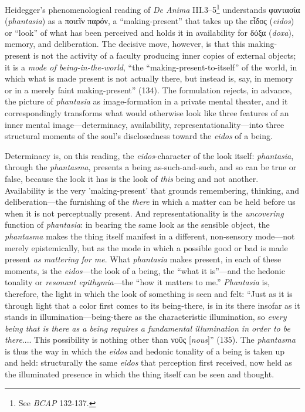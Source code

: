 \documentclass{article}
\newcommand{\gk}[1]{{\greekfont #1}}
\begin{document}
Heidegger's phenomenological reading of \textit{De Anima} III.3–5\footnote{See \textit{BCAP} 132-137.} understands \gk{φαντασία} (\textit{phantasia}) as a \gk{ποιεῖν παρόν}, a ``making-present'' that takes up the \gk{εἶδος} (\textit{eidos}) or ``look'' of what has been perceived and holds it in availability for \gk{δόξα} (\textit{doxa}), memory, and deliberation. The decisive move, however, is that this making-present is not the activity of a faculty producing inner copies of external objects; it is a \textit{mode of being-in-the-world}, ``the ``making-present-to-itself'' of the world, in which what is made present is not actually there, but instead is, say, in memory or in a merely faint making-present'' (134). The formulation rejects, in advance, the picture of \textit{phantasia} as image-formation in a private mental theater, and it correspondingly transforms what would otherwise look like three features of an inner mental image---determinacy, availability, representationality---into three structural moments of the soul's disclosedness toward the \textit{eidos} of a being.

Determinacy is, on this reading, the \textit{eidos}-character of the look itself: \textit{phantasia}, through the \textit{phantasma}, presents a being as-such-and-such, and so can be true or false, because the look it has is the look of \textit{this} being and not another. Availability is the very 'making-present' that grounds remembering, thinking, and deliberation---the furnishing of the \textit{there} in which a matter can be held before us when it is not perceptually present. And representationality is the \textit{uncovering} function of \textit{phantasia}: in bearing the same look as the sensible object, the \textit{phantasma} makes the thing itself manifest in a different, non-sensory mode---not merely epistemically, but as the mode in which a possible good or bad is made present \textit{as mattering for me}. What \textit{phantasia} makes present, in each of these moments, is the \textit{eidos}---the look of a being, the ``what it is''---and the hedonic tonality or \textit{resonant epithymia}---the ``how it matters to me.'' \textit{Phantasia} is, therefore, the light in which the look of something is seen and felt: ``Just as it is through light that a color first comes to its being-there, is in its there insofar as it stands in illumination---being-there as the characteristic illumination, so \textit{every being that is there as a being requires a fundamental illumination in order to be there}.... This possibility is nothing other than \gk{νοῦς} [\textit{nous}]'' (135). The \textit{phantasma} is thus the way in which the \textit{eidos} and hedonic tonality of a being is taken up and held: structurally the same \textit{eidos} that perception first received, now held as the illuminated presence in which the thing itself can be seen and thought.
\end{document}
